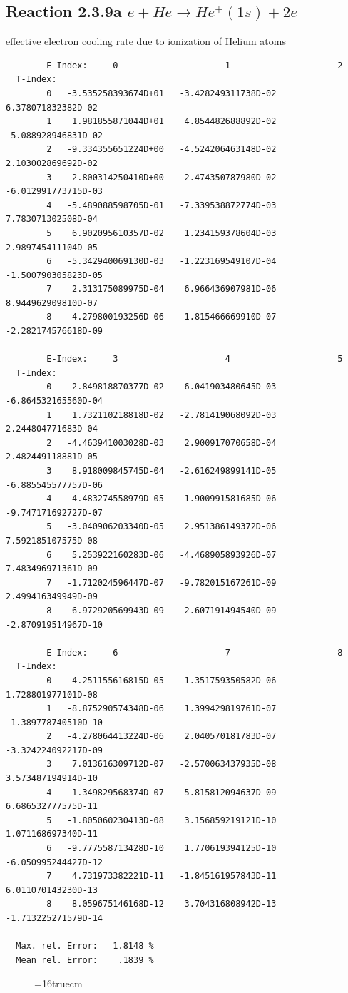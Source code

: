 \documentclass[12pt,dvips]{article}
\begin{document}
\subsection{
Reaction 2.3.9a $e + He \rightarrow He^+(1s) + 2e$
}

   effective electron cooling rate due to ionization of Helium atoms

\begin{small}\begin{verbatim}
        E-Index:     0                     1                     2
  T-Index:
        0   -3.535258393674D+01   -3.428249311738D-02    6.378071832382D-02
        1    1.981855871044D+01    4.854482688892D-02   -5.088928946831D-02
        2   -9.334355651224D+00   -4.524206463148D-02    2.103002869692D-02
        3    2.800314250410D+00    2.474350787980D-02   -6.012991773715D-03
        4   -5.489088598705D-01   -7.339538872774D-03    7.783071302508D-04
        5    6.902095610357D-02    1.234159378604D-03    2.989745411104D-05
        6   -5.342940069130D-03   -1.223169549107D-04   -1.500790305823D-05
        7    2.313175089975D-04    6.966436907981D-06    8.944962909810D-07
        8   -4.279800193256D-06   -1.815466669910D-07   -2.282174576618D-09

        E-Index:     3                     4                     5
  T-Index:
        0   -2.849818870377D-02    6.041903480645D-03   -6.864532165560D-04
        1    1.732110218818D-02   -2.781419068092D-03    2.244804771683D-04
        2   -4.463941003028D-03    2.900917070658D-04    2.482449118881D-05
        3    8.918009845745D-04   -2.616249899141D-05   -6.885545577757D-06
        4   -4.483274558979D-05    1.900991581685D-06   -9.747171692727D-07
        5   -3.040906203340D-05    2.951386149372D-06    7.592185107575D-08
        6    5.253922160283D-06   -4.468905893926D-07    7.483496971361D-09
        7   -1.712024596447D-07   -9.782015167261D-09    2.499416349949D-09
        8   -6.972920569943D-09    2.607191494540D-09   -2.870919514967D-10

        E-Index:     6                     7                     8
  T-Index:
        0    4.251155616815D-05   -1.351759350582D-06    1.728801977101D-08
        1   -8.875290574348D-06    1.399429819761D-07   -1.389778740510D-10
        2   -4.278064413224D-06    2.040570181783D-07   -3.324224092217D-09
        3    7.013616309712D-07   -2.570063437935D-08    3.573487194914D-10
        4    1.349829568374D-07   -5.815812094637D-09    6.686532777575D-11
        5   -1.805060230413D-08    3.156859219121D-10    1.071168697340D-11
        6   -9.777558713428D-10    1.770619394125D-10   -6.050995244427D-12
        7    4.731973382221D-11   -1.845161957843D-11    6.011070143230D-13
        8    8.059675146168D-12    3.704316808942D-13   -1.713225271579D-14

  Max. rel. Error:   1.8148 %
  Mean rel. Error:    .1839 %

\end{verbatim}\end{small}
\begin{figure} \label{2.3.9aer}
\epsfxsize=16truecm
\end{figure}
\newpage
\end{document}
